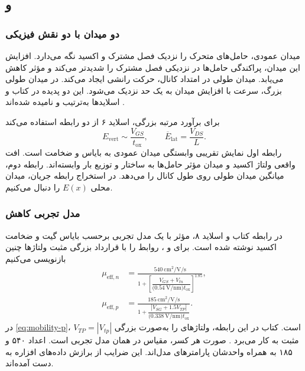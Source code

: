 \subsection{ و }
\label{sec:high-field}
\subsubsection*{دو میدان با دو نقش فیزیکی}
میدان عمودی، حامل‌های متحرک را نزدیک فصل مشترک  و اکسید
نگه می‌دارد. افزایش این میدان، پراکندگی حامل‌ها در نزدیکی فصل مشترک را
شدیدتر می‌کند و  مؤثر کاهش می‌یابد. میدان طولی در امتداد کانال،
حرکت رانشی ایجاد می‌کند. در میدان طولی بزرگ، سرعت با افزایش میدان به یک
حد نزدیک می‌شود. این دو پدیده در کتاب و اسلایدها به‌ترتیب
 و  نامیده شده‌اند
\cite[صفحات چاپی ۷۴ تا ۷۶]{weste}\cite[اسلایدهای ۶ تا ۹]{nonideal}.

برای برآورد مرتبه بزرگی، اسلاید ۶ از دو رابطه استفاده می‌کند
\begin{equation}
 E_{\mathrm{vert}}\sim\frac{V_{GS}}{t_{\mathrm{ox}}},\qquad
 \overline E_{\mathrm{lat}}=\frac{V_{DS}}{L}.
 \label{eq:fields-estimate}
\end{equation}
رابطه اول نمایش تقریبی وابستگی میدان عمودی به بایاس و ضخامت است.
افت واقعی ولتاژ اکسید و میدان مؤثر حامل‌ها به ساختار و توزیع بار وابسته‌اند.
رابطه دوم، میانگین میدان طولی روی طول کانال را می‌دهد. در استخراج رابطه
جریان، میدان محلی \(E(x)\) را دنبال می‌کنیم.

\subsubsection*{مدل تجربی کاهش }
در رابطه  کتاب و اسلاید ۸،  مؤثر با یک مدل تجربی
برحسب بایاس گیت و ضخامت اکسید نوشته شده است. برای  و
، روابط را با قرارداد بزرگی مثبت ولتاژها چنین بازنویسی می‌کنیم
\begin{align}
 \mu_{\mathrm{eff},n}
 &=\frac{\qty{540}{\centi\metre\squared\per\volt\per\second}}
 {1+\left[\dfrac{V_{GS}+V_{tn}}
 {\bigl(\qty{0.54}{\volt\per\nano\metre}\bigr)t_{\mathrm{ox}}}\right]^{1.85}},
 \label{eq:mobility-n}\\[3pt]
 \mu_{\mathrm{eff},p}
 &=\frac{\qty{185}{\centi\metre\squared\per\volt\per\second}}
 {1+\dfrac{\left|V_{SG}+1.5V_{TP}\right|}
 {\bigl(\qty{0.338}{\volt\per\nano\metre}\bigr)t_{\mathrm{ox}}}}.
 \label{eq:mobility-p}
\end{align}
در \eqref{eq:mobility-p}، \(V_{TP}=|V_{tp}|\) است. کتاب در این رابطه،
ولتاژهای  را به‌صورت بزرگی مثبت به کار می‌برد
\cite[رابطه  و مثال ]{weste}. صورت هر کسر،
مقیاس  در همان مدل تجربی است. اعداد ۵۴۰ و ۱۸۵ به همراه
واحدشان پارامترهای مدل‌اند. این ضرایب از برازش داده‌های افزاره به دست آمده‌اند.

